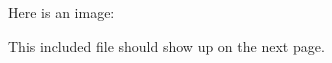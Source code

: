 \documentclass{article}
\begin{document}
Here is an image:

This included file should show up on the next page.

\end{document}
